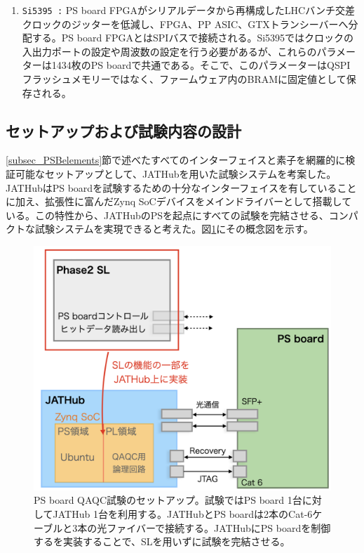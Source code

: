 \begin{enumerate}
    \item \texttt{Si5395 :} PS board FPGAがシリアルデータから再構成したLHCバンチ交差クロックのジッターを低減し、FPGA、PP ASIC、GTXトランシーバーへ分配する。PS board FPGAとはSPIバスで接続される。Si5395ではクロックの入出力ポートの設定や周波数の設定を行う必要があるが、これらのパラメーターは1434枚のPS boardで共通である。そこで、このパラメーターはQSPIフラッシュメモリーではなく、ファームウェア内のBRAMに固定値として保存される。
    \baselineskip

\end{enumerate}

\subsection{セットアップおよび試験内容の設計}
\label{subsec_QAQCdesign}
\ref{subsec_PSBelements}節で述べたすべてのインターフェイスと素子を網羅的に検証可能なセットアップとして、JATHubを用いた試験システムを考案した。JATHubはPS boardを試験するための十分なインターフェイスを有していることに加え、拡張性に富んだZynq SoCデバイスをメインドライバーとして搭載している。この特性から、JATHubのPSを起点にすべての試験を完結させる、コンパクトな試験システムを実現できると考えた。図\ref{PSBtestdesign}にその概念図を示す。

\begin{figure} 
\centering
\includegraphics[width=16cm]{fig/QAQC/PSBtestdesign.png}
\caption[PS board QAQC試験セットアップ]{PS board QAQC試験のセットアップ。試験ではPS board 1台に対してJATHub 1台を利用する。JATHubとPS boardは2本のCat-6ケーブルと3本の光ファイバーで接続する。JATHubにPS boardを制御するを実装することで、SLを用いずに試験を完結させる。}
\label{PSBtestdesign}
\end{figure}


